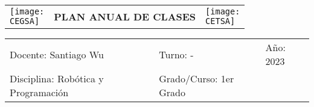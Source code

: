 \documentclass[landscape, a4paper, 10pt]{article}
\newcommand{\profesor}{Santiago Wu}
\newcommand{\discipline}{Robótica y Programación}
\newcommand{\currentyear}{2023}
\newcommand{\group}{1er Grado}
\newcommand{\CEGSA}{cegsa-logo.png}
\newcommand{\CETSA}{cetsa-logo.png}
\begin{document}
	\begin{tabularx}{\textwidth}{ >{\raggedright\arraybackslash}X >{\centering\arraybackslash}X >{\raggedleft\arraybackslash}X }
		\texttt{[image: \\CEGSA]} &
		\textbf{PLAN ANUAL DE CLASES} &
		\texttt{[image: \\CETSA]}
	\end{tabularx}
	\begin{tabularx}{\textwidth}{ >{\raggedright\arraybackslash}X >{\raggedright\arraybackslash}X >{\raggedright\arraybackslash}X }
		Docente: \profesor &
		Turno: - &
		Año: \currentyear \\
		Disciplina: \discipline &
		Grado/Curso: \group &
		 \\
	\end{tabularx}
	\centering
\end{document}
